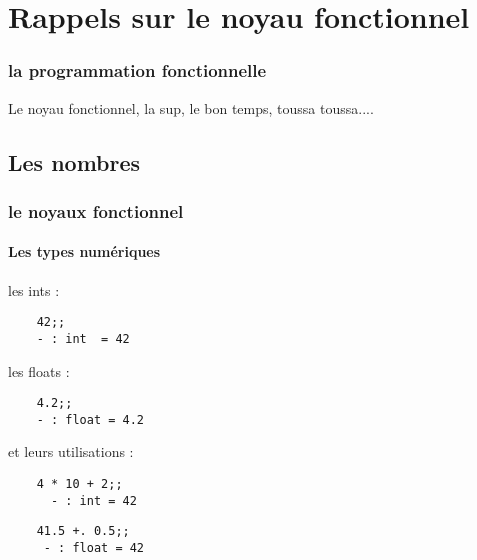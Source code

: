 \section{Rappels sur le noyau fonctionnel}
\begin{frame}
  \begin{center}
    \frametitle{la programmation fonctionnelle}
  Le noyau fonctionnel, la sup, le bon temps, toussa toussa....
  \end{center}
\end{frame}

\subsection{Les nombres}
\begin{frame}[fragile]
  \frametitle{le noyaux fonctionnel}
  \framesubtitle{Les types numériques}
   \begin{minipage}[t]{5cm}
    les ints : 
    \begin{lstlisting}
    42;;
    - : int  = 42
    \end{lstlisting}
   \end{minipage}
   \begin{minipage}[t]{5cm}
    les floats :
    \begin{lstlisting}
    4.2;;
    - : float = 4.2
    \end{lstlisting}
   \end{minipage}
   \vspace{0.5cm}
    et leurs utilisations :\\
   \begin{minipage}[t]{5cm}
     \begin{lstlisting}
    4 * 10 + 2;;
      - : int = 42
     \end{lstlisting}
   \end{minipage}
   \begin{minipage}[t]{5cm}
     \begin{lstlisting}
    41.5 +. 0.5;;
     - : float = 42
     \end{lstlisting}
   \end{minipage}
\end{frame}
